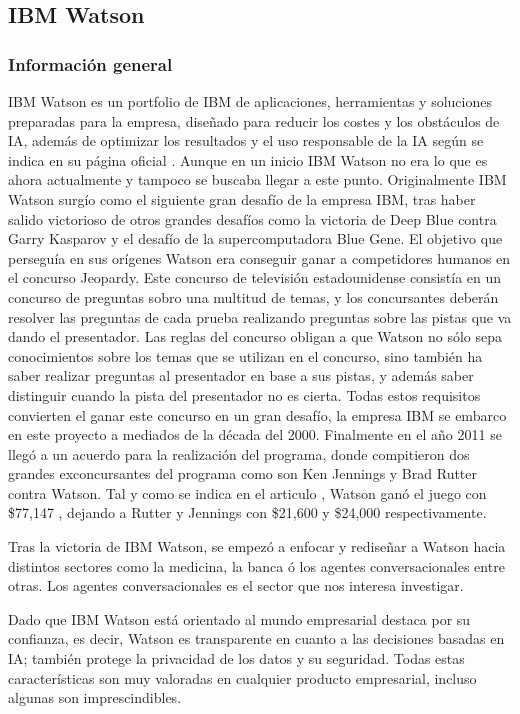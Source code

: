 \subsection{IBM Watson}

\subsubsection*{Información general}

IBM Watson es un portfolio de IBM de aplicaciones, herramientas y soluciones preparadas para la empresa, diseñado para reducir los costes y los obstáculos de IA, además de optimizar los resultados y el uso responsable de la IA según se indica en su página oficial \cite{RefWorks:RefID:15-2021ibm}. Aunque en un inicio IBM Watson no era lo que es ahora actualmente y tampoco se buscaba llegar a este punto. Originalmente IBM Watson surgío como el siguiente gran desafío de la empresa IBM, tras haber salido victorioso de otros grandes desafíos como la victoria de Deep Blue contra Garry Kasparov y el desafío de la supercomputadora Blue Gene. El objetivo que perseguía en sus orígenes Watson era conseguir ganar a competidores humanos en el concurso Jeopardy. Este concurso de televisión estadounidense consistía en un concurso de preguntas sobro una multitud de temas, y los concursantes deberán resolver las preguntas de cada prueba realizando preguntas sobre las pistas que va dando el presentador. Las reglas del concurso obligan a que Watson no sólo sepa conocimientos sobre los temas que se utilizan en el concurso, sino también ha saber realizar preguntas al presentador en base a sus pistas, y además saber distinguir cuando la pista del presentador no es cierta. Todas estos requisitos convierten el ganar este concurso en un gran desafío, la empresa IBM se embarco en este proyecto a mediados de la década del 2000. Finalmente en el año 2011 se llegó a un acuerdo para la realización del programa, donde compitieron dos grandes exconcursantes del programa como son Ken Jennings y Brad Rutter contra Watson. Tal y como se indica en el articulo \cite{RefWorks:RefID:16-best2013ibm}, Watson ganó el juego con \$77,147 , dejando a Rutter y Jennings con \$21,600 y \$24,000 respectivamente.

Tras la victoria de IBM Watson, se empezó a enfocar y rediseñar a Watson hacia distintos sectores como la medicina, la banca ó los agentes conversacionales entre otras. Los agentes conversacionales es el sector que nos interesa investigar.

Dado que IBM Watson está orientado al mundo empresarial destaca por su confianza, es decir, Watson es transparente en cuanto a las decisiones basadas en IA; también protege la privacidad de los datos y su seguridad. Todas estas características son muy valoradas en cualquier producto empresarial, incluso algunas son imprescindibles.

